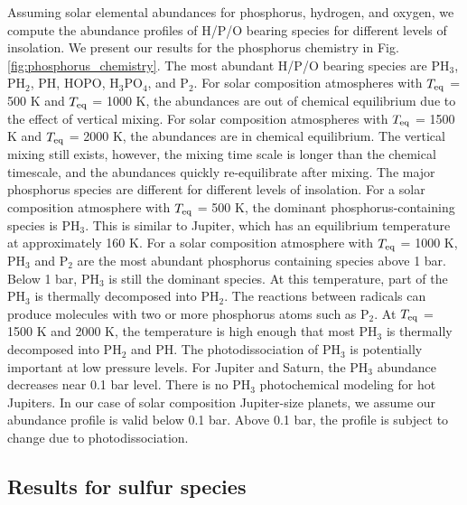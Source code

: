 \documentclass[twocolumn]{aastex61}
\begin{document}
Assuming solar elemental abundances for phosphorus, hydrogen, and oxygen, we compute the abundance profiles of H/P/O bearing species for different levels of insolation. We present our results for the phosphorus chemistry in Fig. \ref{fig:phosphorus_chemistry}. The most abundant H/P/O bearing species are PH$_3$, PH$_2$, PH, HOPO, H$_3$PO$_4$, and P$_2$. For solar composition atmospheres with $T_{\rm eq}$ = 500 K and $T_{\rm eq}$ = 1000 K, the abundances are out of chemical equilibrium due to the effect of vertical mixing. For solar composition atmospheres with $T_{\rm eq}$ = 1500 K and $T_{\rm eq}$ = 2000 K, the abundances are in chemical equilibrium. The vertical mixing still exists, however, the mixing time scale is longer than the chemical timescale, and the abundances quickly re-equilibrate after mixing.  
The major phosphorus species are different for different levels of insolation. For a solar composition atmosphere with $T_{\rm eq}$ = 500 K, the dominant phosphorus-containing species is PH$_3$. This is similar to Jupiter, which has an equilibrium temperature at approximately 160 K. For a solar composition atmosphere with $T_{\rm eq}$ = 1000 K, PH$_3$ and P$_2$ are the most abundant phosphorus containing species above 1 bar. Below 1 bar, PH$_3$ is still the dominant species. At this temperature, part of the PH$_3$ is thermally decomposed into PH$_2$. The reactions between radicals can produce molecules with two or more phosphorus atoms such as P$_2$. At $T_{\rm eq}$ = 1500 K and 2000 K, the temperature is high enough that most PH$_3$ is thermally decomposed into PH$_2$ and PH. The photodissociation of PH$_3$ is potentially important at low pressure levels. For Jupiter and Saturn, the PH$_3$ abundance decreases near 0.1 bar level\citep{Fletcher09a}. There is no PH$_3$ photochemical modeling for hot Jupiters. In our case of solar composition Jupiter-size planets, we assume our abundance profile is valid below 0.1 bar. Above 0.1 bar, the profile is subject to change due to photodissociation. 

\subsection{Results for sulfur species}\label{subsec:S_results}
\end{document}

